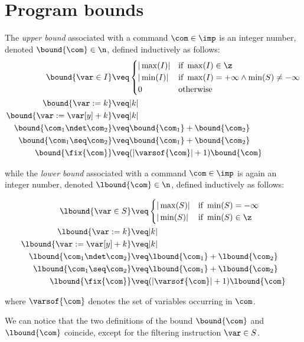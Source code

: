 \section{Program bounds}\label{sec:bounds}

\begin{definition}\label{def:bound}
  The \emph{upper bound} associated with a command \(\com\in \imp\) is
  an integer number, denoted \(\bound{\com}\in \n\), defined
  inductively as follows:
  \begin{align*}
    \bound{\var \in I}  
    & \veq \begin{cases}
      |\max(I)| & \text{if } \max(I)\in\z \\
      |\min(I)| & \text{if } \max(I)=+\infty \land \min(S) \neq -\infty\\
      0 & \text{otherwise}
    \end{cases}
    \\
    \bound{\var := k} 
    & \veq | k |\\
    \bound{\var := \var[y] + k}
    & \veq | k |\\
    \bound{\com_1 \ndet \com_2}
    & \veq \bound{\com_1} + \bound{\com_2}\\
    \bound{\com_1 \seq \com_2}
    & \veq \bound{\com_1} + \bound{\com_2}\\
    \bound{\fix{\com}}
    & \veq (|\varsof{\com}|+1) \bound{\com} \\ 
  \end{align*}

  while the \emph{lower bound} associated with a command
  \(\com\in \imp\) is again an integer number, denoted
  \(\lbound{\com}\in \n\), defined inductively as follows:

  \begin{align*}
    \lbound{\var \in S}  
    & \veq \begin{cases}
      |\max(S)| & \text{if } \min(S)=-\infty\\
      |\min(S)| & \text{if } \min(S)\in \z
    \end{cases}
    \\
    \lbound{\var := k} 
    & \veq | k |\\
    \lbound{\var := \var[y] + k}
    & \veq | k |\\
    \lbound{\com_1 \ndet \com_2}
    & \veq \lbound{\com_1} + \lbound{\com_2}\\
    \lbound{\com_1 \seq \com_2}
    & \veq \lbound{\com_1} + \lbound{\com_2}\\
    \lbound{\fix{\com}}
    & \veq (|\varsof{\com}|+1) \lbound{\com} \\ 
  \end{align*}

  where \(\varsof{\com}\) denotes the set of variables occurring in 
  \(\com\).
\end{definition}

We can notice that the two definitions of the bound \(\bound{\com}\)
and \(\lbound{\com}\) coincide, except for the filtering instruction
\(\var\in S\).
